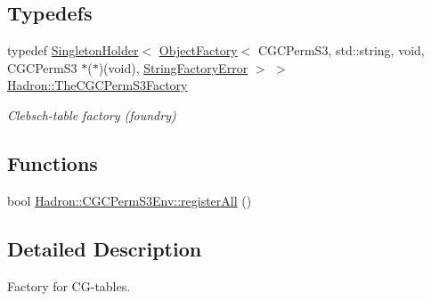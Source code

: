 \subsection*{Typedefs}
\begin{DoxyCompactItemize}
\item 
typedef \mbox{\hyperlink{classUtil_1_1SingletonHolder}{Singleton\+Holder}}$<$ \mbox{\hyperlink{classUtil_1_1ObjectFactory}{Object\+Factory}}$<$ C\+G\+C\+Perm\+S3, std\+::string, void, C\+G\+C\+Perm\+S3 $\ast$($\ast$)(void), \mbox{\hyperlink{structUtil_1_1StringFactoryError}{String\+Factory\+Error}} $>$ $>$ \mbox{\hyperlink{namespaceHadron_a5dba98c73cf8d3f64496a084c7e3d16c}{Hadron\+::\+The\+C\+G\+C\+Perm\+S3\+Factory}}
\begin{DoxyCompactList}\small\item\em Clebsch-\/table factory (foundry) \end{DoxyCompactList}\end{DoxyCompactItemize}
\subsection*{Functions}
\begin{DoxyCompactItemize}
\item 
bool \mbox{\hyperlink{namespaceHadron_1_1CGCPermS3Env_af27896ea7c15a1cdc0c664037d8f9a94}{Hadron\+::\+C\+G\+C\+Perm\+S3\+Env\+::register\+All}} ()
\end{DoxyCompactItemize}


\subsection{Detailed Description}
Factory for C\+G-\/tables. 

